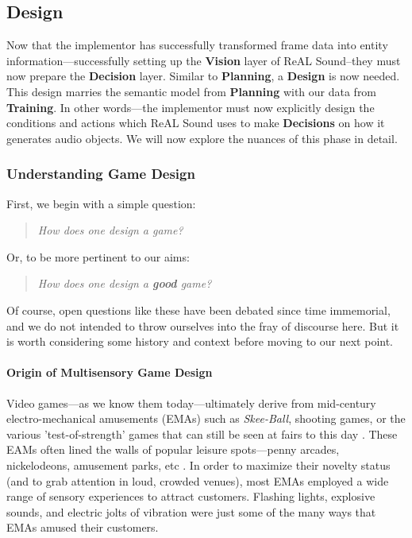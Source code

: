 \documentclass{report}
\newcommand{\rs}{ReAL Sound\xspace}
\newcommand{\plan}{\textbf{Planning}\xspace}
\newcommand{\train}{\textbf{Training}\xspace}
\newcommand{\design}{\textbf{Design}\xspace}
\newcommand{\state}[1]{\textbf{#1}}
\newcommand{\vision}{\textbf{Vision}\xspace}
\newcommand{\decision}{\textbf{Decision}\xspace}
\newcommand{\imp}{implementor\xspace}
\begin{document}
\subsection{Design}
Now that the \imp has successfully transformed frame data into entity information---successfully setting up the \vision layer of \rs--they must now prepare the \decision layer. Similar to \plan, a \design is now needed. This design marries the semantic model from \plan with our data from \train. In other words---the \imp must now explicitly design the conditions and actions which \rs uses to make \state{Decisions} on how it generates audio objects. We will now explore the nuances of this phase in detail.


\subsubsection{Understanding Game Design}

First, we begin with a simple question: 
\begin{quote}
    \emph{How does one design a game?} 
\end{quote}

Or, to be more pertinent to our aims:

\begin{quote}
    \emph{How does one design a \textbf{good} game?} 
\end{quote}

Of course, open questions like these have been debated since time immemorial, and we do not intended to throw ourselves into the fray of discourse here. But it is worth considering some history and context before moving to our next point.

\paragraph{Origin of Multisensory Game Design}
Video games---as we know them today---ultimately derive from mid-century electro-mechanical amusements (EMAs) such as \emph{Skee-Ball}, shooting games, or the various 'test-of-strength' games that can still be seen at fairs to this day \cite{Newman2017Atari}. These EAMs often lined the walls of popular leisure spots---penny arcades, nickelodeons, amusement parks, etc \cite{nasaw1999going}. In order to maximize their novelty status (and to grab attention in loud, crowded venues), most EMAs employed a wide range of sensory experiences to attract customers. Flashing lights, explosive sounds, and electric jolts of vibration were just some of the many ways that EMAs amused their customers. 
\end{document}

